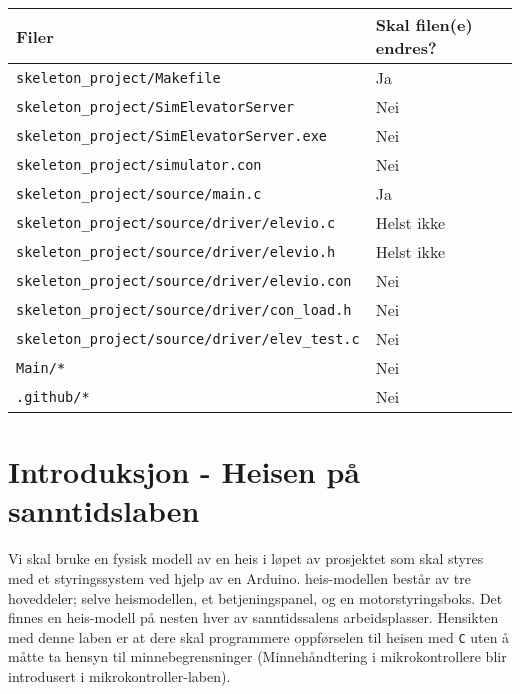 \begin{alphasection}
\begin{center}
 \begin{tabular}{|p{8.5cm} p{5.5cm}|} 
 \hline
 Filer & Skal filen(e) endres?  \\ [0.5ex] 
 \hline\hline
  \verb|skeleton_project/Makefile| & \quad \quad \quad \quad Ja \\
 \hline
   \verb|skeleton_project/SimElevatorServer| & \quad \quad \quad \quad Nei \\
 \hline
   \verb|skeleton_project/SimElevatorServer.exe| & \quad \quad \quad \quad Nei \\
 \hline
   \verb|skeleton_project/simulator.con| & \quad \quad \quad \quad Nei \\
 \hline
  \verb|skeleton_project/source/main.c| & \quad \quad \quad \quad Ja  \\ 
 \hline
  \verb|skeleton_project/source/driver/elevio.c| &  \quad \quad \quad \quad Helst ikke \\ 
 \hline
 \verb|skeleton_project/source/driver/elevio.h| &  \quad \quad \quad \quad Helst ikke \\ 
 \hline
  \verb|skeleton_project/source/driver/elevio.con| &  \quad \quad \quad \quad Nei \\ 
 \hline
  \verb|skeleton_project/source/driver/con_load.h| &  \quad \quad \quad \quad Nei \\ 
 \hline
 \verb|skeleton_project/source/driver/elev_test.c| &  \quad \quad \quad \quad Nei \\
  \hline
 \verb|Main/*| & \quad \quad \quad \quad Nei  \\ 
 \hline
 \verb|.github/*| & \quad \quad \quad \quad Nei \\
 \hline 
\end{tabular}
\end{center}

\clearpage

\section{Introduksjon - Heisen på sanntidslaben}\label{sec:2-innføringheis}

Vi skal bruke en fysisk modell av en heis i løpet av prosjektet som skal styres med et styringssystem ved hjelp av en Arduino. heis-modellen består av tre hoveddeler; selve heismodellen, et betjeningspanel, og en motorstyringsboks. Det finnes en heis-modell på nesten hver av sanntidssalens arbeidsplasser. Hensikten med denne laben er at dere skal programmere oppførselen til heisen med \verb|C| uten å måtte ta hensyn til minnebegrensninger (Minnehåndtering i mikrokontrollere blir introdusert i mikrokontroller-laben).




\end{alphasection}
